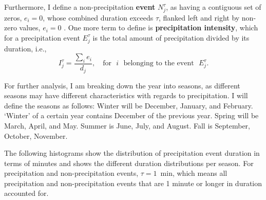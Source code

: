 \documentclass[11pt]{report}
\newcommand{\fracd}[2]{\frac{\displaystyle{#1}}{\displaystyle{#2}}}
\begin{document}
Furthermore, I define a non-precipitation \textbf{event} $N_j^\tau$, as
having a contiguous set of zeros, $e_i=0$, whose combined duration exceeds
$\tau$, flanked left and right by non-zero values, $e_i=0$ \cite{Eagleson}.
One more term to define is \textbf{precipitation intensity}, which for a
precipitation event $E_j^\tau$ is the total amount of precipitation divided
by its duration, i.e.,
\begin{equation}
  I_j^\tau = \fracd{\sum_i e_i }{d_j} ,
  \quad
  \mbox{for}\,\,\,\, i\,\,\,\, \mbox{belonging to the event}\,\,\,\, E_j^\tau
  .
\end{equation}

For further analysis, I am breaking down the year into seasons, as different
seasons may have different characteristics with regards to precipitation. I
will define the seasons as follows: Winter will be December, January, and
February. `Winter' of a certain year contains December of the previous
year. Spring will be March, April, and May. Summer is June, July, and
August. Fall is September, October, November.

The following histograms show the distribution of precipitation event
duration in terms of minutes and shows the different duration distributions
per season. For precipitation and non-precipitation events, $\tau = 1$~min,
which means all precipitation and non-precipitation events that are 1 minute
or longer in duration accounted for. 
\end{document}
